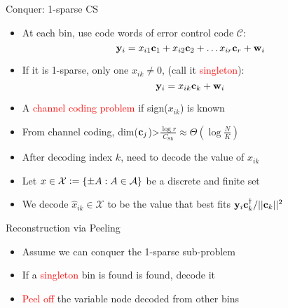 \documentclass[final]{beamer}
\newlength{\twocolwid}
\newlength{\blockskip}
\begin{document}
\begin{frame}
\begin{columns}[t]
\begin{column}{\twocolwid}
    \begin{block}{\Large Conquer: 1-sparse CS}
	    \begin{itemize}
    		\item At each bin, use code words of error control code $\mathcal{C}$:
		    	\begin{equation*}
				    \mathbf{y}_i=x_{i1}\mathbf{c}_1 +x_{i2}\mathbf{c}_{2}+\ldots x_{ir}\mathbf{c}_{r}+\mathbf{w}_i
			    \end{equation*}
    		\item If it is 1-sparse, only one $x_{ik}\neq 0$, (call it \textcolor{red}{singleton}):
		        \begin{equation*}
				    \mathbf{y}_i=x_{ik}\mathbf{c}_k +\mathbf{w}_i
		        \end{equation*}
		    \item A \textcolor{red}{channel coding problem} if sign($x_{ik}$) is known
		    \item  From channel coding, dim($\mathbf{c}_j$)>$\frac{\log r}{C_{\text{Sh}}}\approx \Theta(\log \frac{N}{K})$ 
           \item After decoding index $k$, need to decode the value of $x_{ik}$
		    \item Let $x\in\mathcal{X}\mathrel{\mathop:}=\{\pm A: A\in \mathcal{A}\}$ be a discrete and finite set
		    \item We decode $\hat{x}_{ik}\in\mathcal{X}$ to be the value that best fits $\mathbf{y}_i\mathbf{c}_{k}^{\dagger}/||\mathbf{c}_{k}||^{2}$
    	\end{itemize}
    \end{block}      
\vspace{\blockskip}


 \begin{block}{\Large Reconstruction via Peeling}
    \begin{itemize}
	   \item Assume we can conquer the 1-sparse sub-problem
	   \item If a \textcolor{red}{singleton} bin is found is found, decode it
	   \item \textcolor{red}{Peel off} the variable node decoded from other bins
   \end{itemize}
    

\end{block}
\end{column}
\end{columns}
\end{frame}
\end{document}
